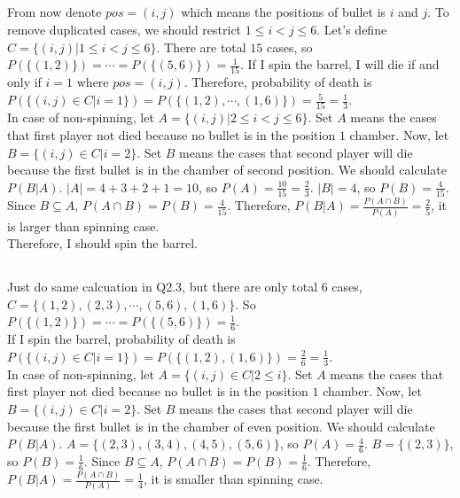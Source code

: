 \documentclass{article}
\begin{document}
\subsection{}
From now denote $pos=(i,j)$ which means the positions of bullet is $i$ and $j$.
To remove duplicated cases, we should restrict $1 \leq i < j \leq 6$.
Let's define $C=\{(i,j) | 1 \leq i < j \leq 6\}$.
There are total $15$ cases, so $P(\{(1,2)\}) = \cdots = P(\{(5,6)\}) = \frac{1}{15}$.
If I spin the barrel, I will die if and only if $i=1$ where $pos=(i,j)$.
Therefore, probability of death is
$P(\{(i,j) \in C | i=1\})
= P(\{(1,2), \cdots, (1,6)\})
= \frac{5}{15} = \frac{1}{3}$. \\

In case of non-spinning, let $A=\{(i,j) | 2 \leq i < j \leq 6\}$.
Set $A$ means the cases that first player not died
    because no bullet is in the position $1$ chamber.
Now, let $B=\{(i,j) \in C | i=2\}$.
Set $B$ means the cases that second player will die
    because the first bullet is in the chamber of second position.
We should calculate $P(B|A)$.
$|A|=4+3+2+1=10$, so $P(A) = \frac{10}{15} = \frac{2}{3}$.
$|B|=4$, so $P(B) = \frac{4}{15}$.
Since $B \subseteq A$, $P(A \cap B) = P(B) = \frac{4}{15}$.
Therefore, $P(B|A) = \frac{P(A \cap B)}{P(A)} = \frac{2}{5}$,
    it is larger than spinning case. \\

Therefore, I should spin the barrel.

\subsection{}
Just do same calcuation in Q2.3, but there are only total 6 cases,
$C = \{(1,2), (2,3), \cdots, (5,6), (1,6)\}$.
So $P(\{(1,2)\}) = \cdots = P(\{(5,6)\}) = \frac{1}{6}$. \\

If I spin the barrel, probability of death is
$P(\{(i,j) \in C | i=1\})
= P(\{(1,2),(1,6)\})
= \frac{2}{6} = \frac{1}{3}$. \\

In case of non-spinning, let $A=\{(i,j) \in C | 2 \leq i\}$.
Set $A$ means the cases that first player not died
    because no bullet is in the position $1$ chamber.
Now, let $B=\{(i,j) \in C | i=2\}$.
Set $B$ means the cases that second player will die
    because the first bullet is in the chamber of even position.
We should calculate $P(B|A)$.
$A=\{(2,3),(3,4),(4,5),(5,6)\}$, so $P(A)=\frac{4}{6}$.
$B=\{(2,3)\}$, so $P(B)=\frac{1}{6}$.
Since $B \subseteq A$, $P(A \cap B) = P(B) = \frac{1}{6}$.
Therefore, $P(B|A) = \frac{P(A \cap B)}{P(A)} = \frac{1}{4}$,
    it is smaller than spinning case. \\
\end{document}
